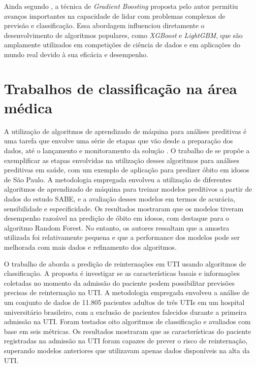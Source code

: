Ainda segundo , a técnica de \textit{Gradient Boosting} proposta pelo autor permitiu avanços importantes na capacidade de lidar com problemas complexos de previsão e classificação. Essa abordagem influenciou diretamente o desenvolvimento de algoritmos populares, como \textit{XGBoost} e \textit{LightGBM}, que são amplamente utilizados em competições de ciência de dados e em aplicações do mundo real devido à sua eficácia e desempenho.

\section{Trabalhos de classificação na área médica}\label{sec-context}

A utilização de algoritmos de aprendizado de máquina para análises preditivas é uma tarefa que envolve uma série de etapas que vão desde  a preparação dos dados, até o lançamento e monitoramento da solução \cite{geron2022hands}. O trabalho de  se propõe a exemplificar as etapas envolvidas na utilização desses algoritmos para análises preditivas em saúde, com um exemplo de aplicação para predizer óbito em idosos de São Paulo. A metodologia empregada envolveu a utilização de diferentes algoritmos de aprendizado de máquina para treinar modelos preditivos a partir de dados do estudo SABE, e a avaliação desses modelos em termos de acurácia, sensibilidade e especificidade. Os resultados mostraram que os modelos tiveram desempenho razoável na predição de óbito em idosos, com destaque para o algoritmo Random Forest. No entanto, os autores ressaltam que a amostra utilizada foi relativamente pequena e que a performance dos modelos pode ser melhorada com mais dados e refinamento dos algoritmos.

O trabalho de  aborda a predição de reinternações em UTI usando algoritmos de classificação. A proposta é investigar se as características basais e informações coletadas no momento da admissão do paciente podem possibilitar previsões precisas de reinternação na UTI. A metodologia empregada envolveu a análise de um conjunto de dados de 11.805 pacientes adultos de três UTIs em um hospital universitário brasileiro, com a exclusão de pacientes falecidos durante a primeira admissão na UTI. Foram testados oito algoritmos de classificação e avaliados com base em seis métricas. Os resultados mostraram que as características do paciente registradas na admissão na UTI foram capazes de prever o risco de reinternação, superando modelos anteriores que utilizavam apenas dados disponíveis na alta da UTI.

